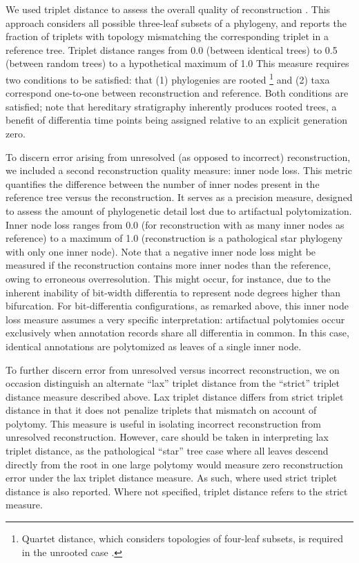 We used triplet distance to assess the overall quality of reconstruction \citep{critchlow1996triples}.
This approach considers all possible three-leaf subsets of a phylogeny, and reports the fraction of triplets with topology mismatching the corresponding triplet in a reference tree.
Triplet distance ranges from 0.0 (between identical trees) to 0.5 (between random trees) to a hypothetical maximum of 1.0
This measure requires two conditions to be satisfied: that (1) phylogenies are rooted%
\footnote{Quartet distance, which considers topologies of four-leaf subsets, is required in the unrooted case \citep{estabrook1985comparison}.}
and (2) taxa correspond one-to-one between reconstruction and reference.
Both conditions are satisfied; note that hereditary stratigraphy inherently produces rooted trees, a benefit of differentia time points being assigned relative to an explicit generation zero.

To discern error arising from unresolved (as opposed to incorrect) reconstruction, we included a second reconstruction quality measure: inner node loss.
This metric quantifies the difference between the number of inner nodes present in the reference tree versus the reconstruction.
It serves as a precision measure, designed to assess the amount of phylogenetic detail lost due to artifactual polytomization.
Inner node loss ranges from 0.0 (for reconstruction with as many inner nodes as reference) to a maximum of 1.0 (reconstruction is a pathological star phylogeny with only one inner node).
Note that a negative inner node loss might be measured if the reconstruction contains more inner nodes than the reference, owing to erroneous overresolution.
This might occur, for instance, due to the inherent inability of bit-width differentia to represent node degrees higher than bifurcation.
For bit-differentia configurations, as remarked above, this inner node loss measure assumes a very specific interpretation: artifactual polytomies occur exclusively when annotation records share all differentia in common.
In this case, identical annotations are polytomized as leaves of a single inner node.

To further discern error from unresolved versus incorrect reconstruction, we on occasion distinguish an alternate ``lax'' triplet distance from the ``strict'' triplet distance measure described above.
Lax triplet distance differs from strict triplet distance in that it does not penalize triplets that mismatch on account of polytomy.
This measure is useful in isolating incorrect reconstruction from unresolved reconstruction.
However, care should be taken in interpreting lax triplet distance, as the pathological ``star'' tree case where all leaves descend directly from the root in one large polytomy would measure zero reconstruction error under the lax triplet distance measure.
As such, where used strict triplet distance is also reported.
Where not specified, triplet distance refers to the strict measure.

